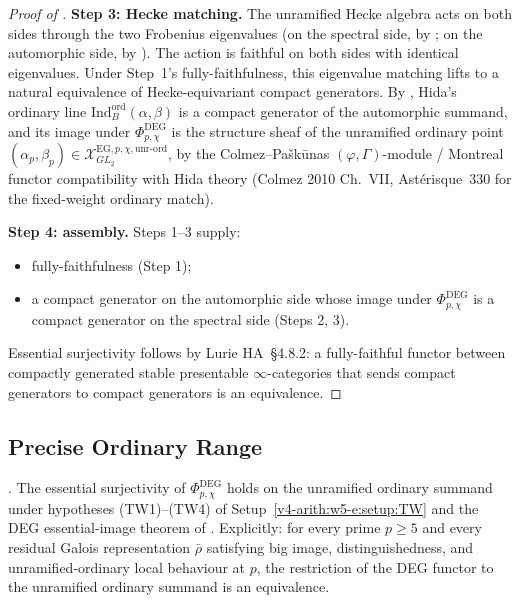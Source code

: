 \begin{proof}[Proof of ]
\textbf{Step 3: Hecke matching.} The unramified Hecke algebra acts
on both sides through the two Frobenius eigenvalues (on the spectral
side, by ; on the automorphic side,
by ). The action is faithful on
both sides with identical eigenvalues. Under Step~1's
fully-faithfulness, this eigenvalue matching lifts to a natural
equivalence of Hecke-equivariant compact generators. By
, Hida's ordinary line
\(\mathrm{Ind}^{\mathrm{ord}}_{B}(\alpha,\beta)\) is a compact generator
of the automorphic summand, and its image under
\(\Phi^{\mathrm{DEG}}_{p,\chi}\) is the structure sheaf of the
unramified ordinary point \((\alpha_{p},\beta_{p})\in
\mathcal{X}^{\mathrm{EG},p,\chi,\mathrm{unr\text{-}ord}}_{GL_{2}}\),
by the Colmez--Pa{\v s}k{\=u}nas \((\varphi,\Gamma)\)-module / Montreal
functor compatibility with Hida theory (Colmez 2010 Ch.~VII,
Ast{\'e}risque~330 for the fixed-weight ordinary match).

\textbf{Step 4: assembly.} Steps 1--3 supply:
\begin{itemize}
\item fully-faithfulness (Step 1);
\item a compact generator on the automorphic side whose image under
\(\Phi^{\mathrm{DEG}}_{p,\chi}\) is a compact generator on the spectral
side (Steps 2, 3).
\end{itemize}
Essential surjectivity follows by Lurie HA~\S 4.8.2: a fully-faithful
functor between compactly generated stable presentable
\(\infty\)-categories that sends compact generators to compact
generators is an equivalence.
\end{proof}

\subsection{Precise Ordinary Range}

\begin{corollary}
\label{v4-arith:w5-e:cor:f1a1-uncond-range}
\ClaimStatusProvedHereConditional. The essential surjectivity of
\(\Phi^{\mathrm{DEG}}_{p,\chi}\) holds on the unramified ordinary
summand under hypotheses (TW1)--(TW4) of
Setup~\ref{v4-arith:w5-e:setup:TW} and the DEG essential-image
theorem of . Explicitly: for every prime
\(p\geq 5\) and every residual Galois representation \(\bar\rho\)
satisfying big image, distinguishedness, and unramified-ordinary
local behaviour at \(p\), the restriction of the DEG functor to the
unramified ordinary summand is an equivalence.
\end{corollary}

